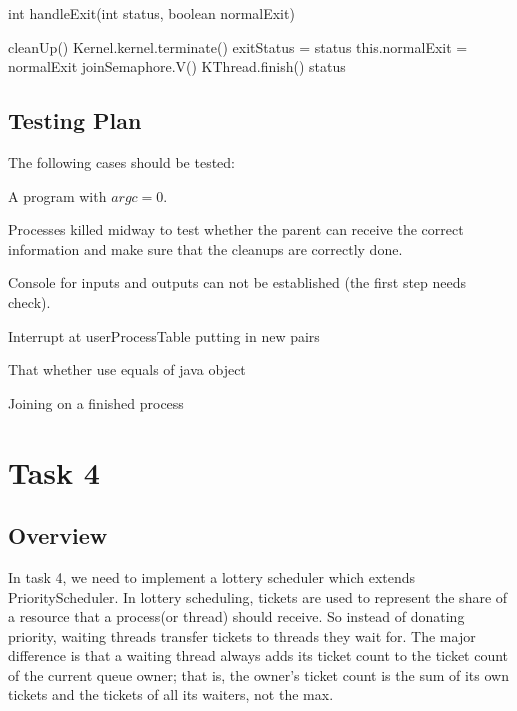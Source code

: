 \documentclass{article}
\begin{document}
\begin{spacing}{1.1}
\begin{algorithm}
  \label{alg:handleExit}
  \caption{int \textsf{handleExit}(int status, boolean normalExit)}
  \textsf{cleanUp}()\;
   {
    Kernel.kernel.terminate()\;
  }
  exitStatus = status\;
  this.normalExit = normalExit\;
  joinSemaphore.V()\;
  \colorbox{myyellow}{KThread.finish()}\;
  \Return status\;
\end{algorithm}

\subsection{Testing Plan}
The following cases should be tested:
\begin{asparaitem}
  \item A program with $argc=0$.
  \item Processes killed midway to test whether the parent can receive the correct information and make sure that the cleanups are correctly done.
  \item Console for inputs and outputs can not be established (the first step needs check).
  \item Interrupt at userProcessTable putting in new pairs
  \item That whether use equals of java object
  \item Joining on a finished process
\end{asparaitem}


\section{Task 4}

\subsection{Overview}
In task 4, we need to implement a lottery scheduler which extends \textsf{PriorityScheduler}. In lottery scheduling, tickets are used to represent the share of a resource that a process(or thread) should receive. So instead of donating priority, waiting threads transfer tickets to threads they wait for. The major difference is that a waiting thread always adds its ticket count to the ticket count of the current queue owner; that is, the owner's ticket count is the sum of its own tickets and the tickets of all its waiters, not the max.


\end{spacing}
\end{document}
